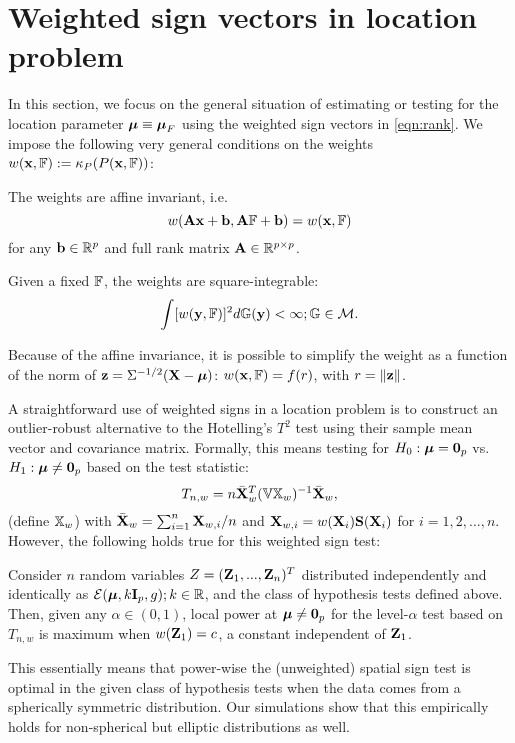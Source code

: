 \section{Weighted sign vectors in location problem}
\label{section:LocSection}
In this section, we focus on the general situation of estimating or testing for the location parameter ${\boldsymbol{\mu}} \equiv {\boldsymbol{\mu}}_F$ using the weighted sign vectors in \eqref{eqn:rank}. We impose the following very general conditions on the weights $w({\bf{x}}, {\mathbb{F}}) := \kappa_P(P({\bf{x}}, {\mathbb{F}}))$:

\vspace{1em}
 The weights are affine invariant, i.e.
%
$$
w({\mathbf{A}} {\bf{x}} + {\bf{b}}, {\mathbf{A}} {\mathbb{F}} + {\bf{b}}) = w({\bf{x}}, {\mathbb{F}})
$$
%
for any ${\bf{b}} \in {\mathbb{R}}^p$ and full rank matrix ${\mathbf{A}} \in {\mathbb{R}}^{p \times p}$.

 Given a fixed ${\mathbb{F}}$, the weights are square-integrable:
%
$$
\int [w({\bf{y}}, {\mathbb{F}})]^2 d{\mathbb{G}}({\bf{y}}) < \infty; {\mathbb{G}} \in \mathcal{M}.
$$

\vspace{1em}
\noindent Because of the affine invariance, it is possible to simplify the weight as a function of the norm of ${\bf{z}} = \Sigma^{-1/2} ({\mathbf{X}} - {\boldsymbol{\mu}})$: $w({\bf{x}}, {\mathbb{F}}) = f(r)$, with $r = \| {\bf{z}} \|$.

A straightforward use of weighted signs in a location problem is to construct an outlier-robust alternative to the Hotelling's $T^2$ test using their sample mean vector and covariance matrix. Formally, this means testing for $H_0: {\boldsymbol{\mu}} = {\bf 0}_p$ vs. $H_1:{\boldsymbol{\mu}} \neq {\bf 0}_p$  based on the test statistic:
%
$$
T_{n,w} = n \bar{{\mathbf{X}}}_w^T ( {\mathbb{V}} {\mathbb{X}}_w)^{-1} \bar{{\mathbf{X}}}_w,
$$
%
({\colrbf define ${\mathbb{X}}_w$}) with $\bar{{\mathbf{X}}}_w = \sum_{i=1}^n {\mathbf{X}}_{w,i}/n$ and ${\mathbf{X}}_{w,i} = w({\mathbf{X}}_i ) {\mathbf{S}} ({\mathbf{X}}_i)$ for $i=1,2,...,n$. However, the following holds true for this weighted sign test:
%
\begin{Proposition}\label{proposition:SignTest}
Consider $n$ random variables $Z = ({\mathbf{Z}}_1,...,{\mathbf{Z}}_n)^T$ distributed independently and identically as $\mathcal{E}( {\boldsymbol{\mu}}, k {\mathbf{I}}_p, g); k \in \mathbb R$, and the class of hypothesis tests defined above. Then, given any $\alpha \in (0,1)$, local power at ${\boldsymbol{\mu}} \neq {\bf 0}_p$ for the level-$\alpha$ test  based on $T_{n,w}$ is maximum when $w({\mathbf{Z}}_1) = c$, a constant independent of ${\mathbf{Z}}_1$.
\end{Proposition}
%
\noindent This essentially means that power-wise the (unweighted) spatial sign test \citep{OjaBook10} is optimal in the given class of hypothesis tests when the data comes from a spherically symmetric distribution. Our simulations show that this empirically holds for non-spherical but elliptic distributions as well.

